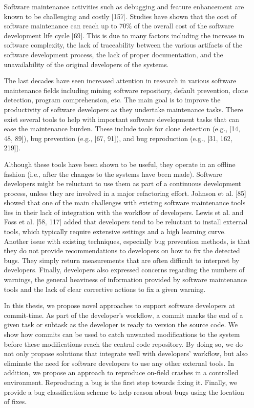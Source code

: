 \documentclass[12pt]{report}
\begin{document}
Software maintenance activities such as debugging and feature
enhancement are known to be challenging and costly {[}157{]}. Studies
have shown that the cost of software maintenance can reach up to 70\% of
the overall cost of the software development life cycle {[}69{]}. This
is due to many factors including the increase in software complexity,
the lack of traceability between the various artifacts of the software
development process, the lack of proper documentation, and the
unavailability of the original developers of the systems.

The last decades have seen increased attention in research in various
software maintenance fields including mining software repository,
default prevention, clone detection, program comprehension, etc. The
main goal is to improve the productivity of software developers as they
undertake maintenance tasks. There exist several tools to help with
important software development tasks that can ease the maintenance
burden. These include tools for clone detection (e.g., {[}14, 48,
89{]}), bug prevention (e.g., {[}67, 91{]}), and bug reproduction (e.g.,
{[}31, 162, 219{]}). 

Although these tools have been shown to be useful,
they operate in an offline fashion (i.e., after the changes to the
systems have been made). Software developers might be reluctant to use
them as part of a continuous development process, unless they
are involved in a major refactoring effort. Johnson et al. {[}85{]}
showed that one of the main challenges with existing software maintenance tools lies in their lack of integration with the workflow of developers. Lewis
et al. and Foss et al. {[}58, 117{]} added that developers tend to be
reluctant to install external tools, which typically require extensive
settings and a high learning curve. Another issue with existing
techniques, especially bug prevention methods, is that they do not
provide recommendations to developers on how to fix the detected bugs.
They simply return measurements that are often difficult to interpret by
developers. Finally, developers also expressed concerns regarding the
numbers of warnings, the general heaviness of information provided by
software maintenance tools and the lack of clear corrective actions to
fix a given warning.

In this thesis, we propose novel approaches to support software
developers at commit-time. As part of the developer's workflow, a commit
marks the end of a given task or subtask as the developer is ready to
version the source code. We show how commits can be used to catch
unwanted modifications to the system before these modifications reach
the central code repository. By doing so, we do not only propose
solutions that integrate well with developers' workflow, but also
eliminate the need for software developers to use any other external
tools. In addition,  we propose an approach
to reproduce on-field crashes in a controlled environment. Reproducing a bug is the first step towards fixing it.
Finally, we provide a bug classification scheme to help reason about bugs using the location of fixes. 
\end{document}
